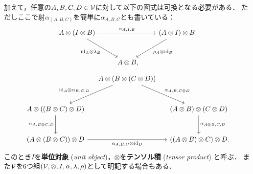 \documentclass[uplatex,a4paper,dvipdfmx]{jsarticle}
\begin{document}
\begin{dfn}
\begin{enumerate}
            加えて，任意の$A, B, C, D \in {\mathcal{V}}$に対して以下の図式は可換となる必要がある．
            ただしここで射$\alpha_{(A, B, C)}$を簡単に$\alpha_{A, B, C}$とも書いている：
            \begin{equation*}
                \begin{tikzcd}[row sep=large]
                    A \otimes (I \otimes B) \arrow[rr, "\alpha_{A, I, B}"] \arrow[rd, "\id_A \otimes \lambda_B"']
                        &
                        & (A \otimes I) \otimes B \arrow[ld, "\rho_A \otimes \id_B"] \\
                        & A \otimes B \rlap{,}
                \end{tikzcd}
            \end{equation*}
            \begin{equation*}
                \begin{tikzcd}[row sep=large, column sep=small]
                        & A \otimes (B \otimes (C \otimes D)) \arrow[ld, "\id_A \otimes \alpha_{B, C, D}"'] \arrow[rd, "\alpha_{A, B, C \otimes D}"]& \\
                    A \otimes ((B \otimes C) \otimes D) \arrow[d, "\alpha_{A, B \otimes C, D}"']
                        & 
                        & (A \otimes B) \otimes (C \otimes D) \arrow[d, "\alpha_{A \otimes B, C, D}"] \\
                        (A \otimes (B \otimes C)) \otimes D \arrow[rr, "\alpha_{A, B, C} \otimes \id_D"']
                        & 
                        & ((A \otimes B) \otimes C) \otimes D \rlap{.}
                \end{tikzcd}
            \end{equation*}
            このとき$I$を\textbf{単位対象} (\textit{unit object})，$\otimes$を\textbf{テンソル積} (\textit{tensor product}) と呼ぶ．
            また${\mathcal{V}}$を6つ組$({\mathcal{V}}, \otimes, I, \alpha, \lambda, \rho)$として明記する場合もある．

\end{enumerate}
\end{dfn}
\end{document}
